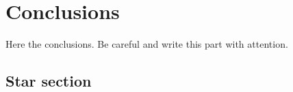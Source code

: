 \documentclass[debug]{phd}
\begin{document}
	\chapter*{Conclusions}
	
		Here the conclusions. Be careful and write this part with attention.
		
	\section*{Star section}
		
\end{document}
